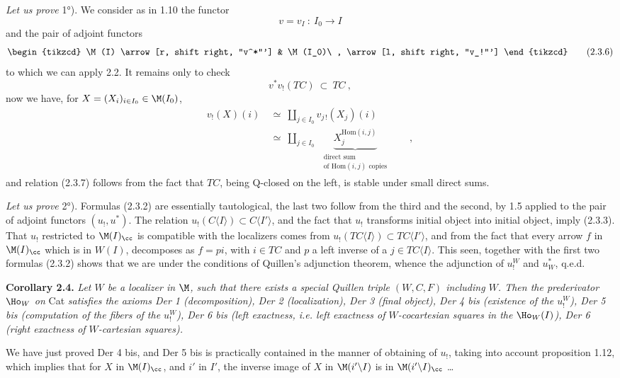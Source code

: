 \textit{Let us prove} 1°). We consider as in 1.10 the functor
\[
v = v_I\ :\ I_0 \longrightarrow I
\]
and the pair of adjoint functors
\[
\begin{tikzcd}
\M(I) \arrow[r, shift right, "v^*"'] & \M(I_0)\ , \arrow[l, shift right, "v_!"']
\end{tikzcd}
\tag*{(2.3.6)}
\]
to which we can apply 2.2. It remains
only to check
\[
v^*v_!(TC)\ \subset\ TC\ ,
\tag*{(2.3.7)}
\]
now we have, for $X = (X_i)_{i \in I_0} \in \M(I_0)$,
\[
\begin{aligned}
v_!(X)(i) &\ \simeq\ \textstyle\coprod_{j \in I_0} v_{j\,!}(X_j)(i)\\
&\ \simeq\ \textstyle\coprod_{j \in I_0}\ \ \underbrace{X_j^{\mathrm{Hom}(i,j)}}_{\substack{\text{direct sum}\\ \text{of }\mathrm{Hom}(i,j)\text{ copies}}}\qquad ,
\end{aligned}
\]
and relation (2.3.7) follows from the fact that $TC$, being Q-closed on the left, is stable under small direct sums.

\textit{Let us prove} 2°). Formulas (2.3.2) are essentially tautological, the last two follow from the third and the second, by 1.5 applied to the pair of adjoint functors $(u_!,u^*)$. The relation $u_!(C\langle I\rangle) \subset C\langle I'\rangle$, and the fact that $u_!$ transforms initial object into initial object, imply (2.3.3). That $u_!$ restricted to $\M(I)_{\cc}$ is compatible with the localizers comes from $u_!(TC\langle I\rangle) \subset TC\langle I'\rangle$, and from the fact that every arrow $f$ in $\M(I)_{\cc}$ which is in $W(I)$, decomposes as $f = pi$, with $i \in TC$ and $p$ a left inverse of a $j \in TC\langle I\rangle$. This seen, together with the first two formulas (2.3.2) shows that we are under the conditions
of Quillen's adjunction theorem, whence the adjunction of $u_!^W$ and $u^*_W$, q.e.d.

\textbf{Corollary 2.4.} \textit{Let $W$ be a localizer in $\M$, such that there exists a special Quillen triple $(W,C,F)$ including $W$. Then the prederivator} $\Ho_W$ \textit{on} Cat \textit{satisfies the axioms Der 1 (decomposition), Der 2 (localization), Der 3 (final object), Der 4 bis (existence of the $u_!^W$), Der 5 bis (computation of the fibers of the $u_!^W$), Der 6 bis (left exactness, i.e. left exactness of $W$-cocartesian squares in the} $\Ho_W(I)$\textit{), Der 6 (right exactness of $W$-cartesian squares).} %

We have just proved Der 4 bis, and Der 5 bis is practically contained in the manner of obtaining of $u_!$, taking into account proposition 1.12, which implies that for $X$ in $\M(I)_{\cc}$, and $i'$ in $I'$, the inverse image of $X$ in $\M(i'\backslash I)$ is in $\M(i'\backslash I)_{\cc}$ \dots